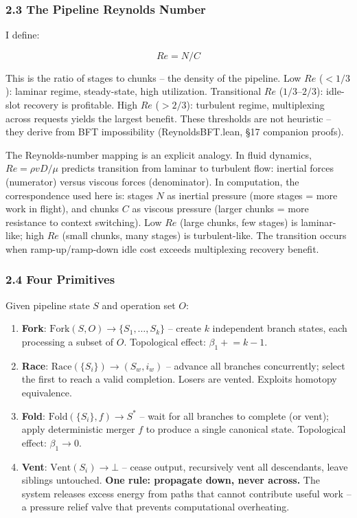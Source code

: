 \documentclass[
  11pt,
]{article}
\begin{document}
\subsubsection{2.3 The Pipeline Reynolds
Number}\label{the-pipeline-reynolds-number}

I define:

\[
Re = N / C
\]

This is the ratio of stages to chunks -- the density of the pipeline.
Low \(Re\) (\(< 1/3\)): laminar regime, steady-state, high utilization.
Transitional \(Re\) (\(1/3\)--\(2/3\)): idle-slot recovery is
profitable. High \(Re\) (\(> 2/3\)): turbulent regime, multiplexing
across requests yields the largest benefit. These thresholds are not
heuristic -- they derive from BFT impossibility (ReynoldsBFT.lean,
\S17 companion proofs).

The Reynolds-number mapping is an explicit analogy. In fluid dynamics,
\(Re = \rho v D / \mu\) predicts transition from laminar to turbulent
flow: inertial forces (numerator) versus viscous forces (denominator).
In computation, the correspondence used here is: stages \(N\) as
inertial pressure (more stages = more work in flight), and chunks \(C\)
as viscous pressure (larger chunks = more resistance to context
switching). Low \(Re\) (large chunks, few stages) is laminar-like; high
\(Re\) (small chunks, many stages) is turbulent-like. The transition
occurs when ramp-up/ramp-down idle cost exceeds multiplexing recovery
benefit.

\subsubsection{2.4 Four Primitives}\label{four-primitives}

Given pipeline state \(S\) and operation set \(O\):

\begin{enumerate}
\def\labelenumi{\arabic{enumi}.}
\item
  \textbf{Fork}: \(\text{Fork}(S, O) \to \{S_1, \ldots, S_k\}\) --
  create \(k\) independent branch states, each processing a subset of
  \(O\). Topological effect: \(\beta_1 \mathrel{+}= k-1\).
\item
  \textbf{Race}: \(\text{Race}(\{S_i\}) \to (S_w, i_w)\) -- advance all
  branches concurrently; select the first to reach a valid completion.
  Losers are vented. Exploits homotopy equivalence.
\item
  \textbf{Fold}: \(\text{Fold}(\{S_i\}, f) \to S^*\) -- wait for all
  branches to complete (or vent); apply deterministic merger \(f\) to
  produce a single canonical state. Topological effect:
  \(\beta_1 \to 0\).
\item
  \textbf{Vent}: \(\text{Vent}(S_i) \to \bot\) -- cease output,
  recursively vent all descendants, leave siblings untouched.
  \textbf{One rule: propagate down, never across.} The system releases
  excess energy from paths that cannot contribute useful work -- a
  pressure relief valve that prevents computational overheating.
\end{enumerate}
\end{document}
